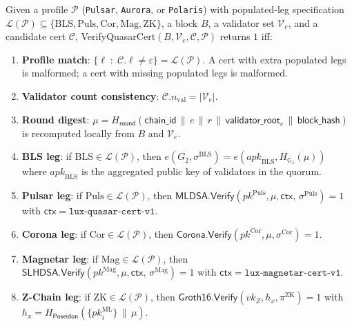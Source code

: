 \begin{definition}
\label{def:verify}
Given a profile $\mathcal{P}$ (\texttt{Pulsar}, \texttt{Aurora}, or
\texttt{Polaris}) with populated-leg specification
$\mathcal{L}(\mathcal{P}) \subseteq \{\mathrm{BLS}, \mathrm{Puls},
\mathrm{Cor}, \mathrm{Mag}, \mathrm{ZK}\}$, a block $B$, a validator
set $\mathcal{V}_e$, and a candidate cert $\mathcal{C}$,
\textsf{VerifyQuasarCert}$(B, \mathcal{V}_e, \mathcal{C}, \mathcal{P})$
returns $1$ iff:

\begin{enumerate}[leftmargin=2em,nosep]
\item \textbf{Profile match}: $\bigl\{\ell \;:\; \mathcal{C}.\ell \neq
      \varepsilon\bigr\} = \mathcal{L}(\mathcal{P})$.
      A cert with extra populated legs is malformed; a cert with
      missing populated legs is malformed.
\item \textbf{Validator count consistency}: $\mathcal{C}.n_{\mathrm{val}}
      = |\mathcal{V}_e|$.
\item \textbf{Round digest}: $\mu = H_{\mathsf{round}}(\mathsf{chain\_id}
      \,\|\, e \,\|\, r \,\|\, \mathsf{validator\_root}_e \,\|\,
      \mathsf{block\_hash})$ is recomputed locally from $B$ and
      $\mathcal{V}_e$.
\item \textbf{BLS leg}: if $\mathrm{BLS} \in \mathcal{L}(\mathcal{P})$,
      then $e(G_2, \sigma^{\mathrm{BLS}}) = e(\mathit{apk}_{\mathrm{BLS}},
      H_{\mathbb{G}_1}(\mu))$ where $\mathit{apk}_{\mathrm{BLS}}$ is
      the aggregated public key of validators in the quorum.
\item \textbf{Pulsar leg}: if $\mathrm{Puls} \in \mathcal{L}(\mathcal{P})$,
      then $\mathsf{MLDSA.Verify}(\mathit{pk}^{\mathrm{Puls}}, \mu,
      \mathsf{ctx},\, \sigma^{\mathrm{Puls}}) = 1$ with
      $\mathsf{ctx} = \texttt{lux-quasar-cert-v1}$.
\item \textbf{Corona leg}: if $\mathrm{Cor} \in \mathcal{L}(\mathcal{P})$,
      then $\mathsf{Corona.Verify}(\mathit{pk}^{\mathrm{Cor}}, \mu,
      \sigma^{\mathrm{Cor}}) = 1$.
\item \textbf{Magnetar leg}: if $\mathrm{Mag} \in \mathcal{L}(\mathcal{P})$,
      then $\mathsf{SLHDSA.Verify}(\mathit{pk}^{\mathrm{Mag}}, \mu,
      \mathsf{ctx},\, \sigma^{\mathrm{Mag}}) = 1$ with
      $\mathsf{ctx} = \texttt{lux-magnetar-cert-v1}$.
\item \textbf{Z-Chain leg}: if $\mathrm{ZK} \in \mathcal{L}(\mathcal{P})$,
      then $\mathsf{Groth16.Verify}(\mathit{vk}_Z, h_x, \pi^{\mathrm{ZK}})
      = 1$ with $h_x = H_{\mathsf{Poseidon}}(\{\mathit{pk}_i^{\mathrm{ML}}\}\,\|\,\mu)$.
\end{enumerate}
\end{definition}

